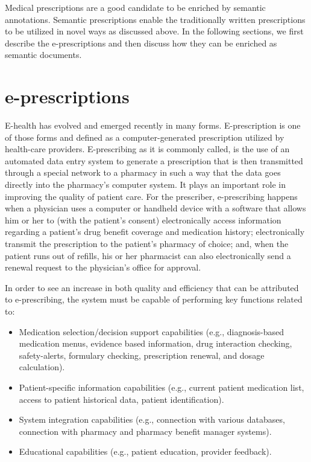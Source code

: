 \documentclass[10pt, conference, compsocconf]{IEEEtran}
\begin{document}

Medical prescriptions are a good candidate to be enriched by semantic annotations.
Semantic prescriptions enable the traditionally written prescriptions to be utilized in novel ways as discussed above.
In the following sections, we first describe the e-prescriptions and then discuss how they can be enriched as semantic documents.

\section{e-prescriptions}
\label{sec:epresc}
E-health has evolved and emerged recently in many forms.
E-prescription is one of those forms and defined as a computer-generated prescription utilized by health-care providers.
E-prescribing as it is commonly called, is the use of an automated data entry system to generate a prescription that is then transmitted through a special network to a pharmacy in such a way that the data goes directly into the pharmacy’s computer system.
It plays an important role in improving the quality of patient care.
For the prescriber, e-prescribing happens when a physician uses a computer or handheld device with a software that allows him or her to (with the patient’s consent) electronically access information regarding a patient’s drug benefit coverage and medication history; electronically transmit the prescription to the patient’s pharmacy of choice; and, when the patient runs out of refills, his or her pharmacist can also electronically send a renewal request to the physician’s office for approval.

In order to see an increase in both quality and efficiency that can be attributed to e-prescribing, the system must be capable of performing key functions related to:
\begin{itemize}
  \item Medication selection/decision support capabilities (e.g., diagnosis-based medication menus, evidence based information, drug interaction checking, safety-alerts, formulary checking, prescription renewal, and dosage calculation).
  \item Patient-specific information capabilities (e.g., current patient medication list, access to patient historical data, patient identification).
  \item System integration capabilities (e.g., connection with various databases, connection with pharmacy and pharmacy benefit manager systems).
  \item Educational capabilities (e.g., patient education, provider feedback).
\end{itemize}
\end{document}
